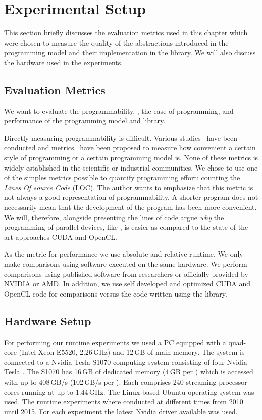 \section{Experimental Setup}
\label{sec:skelcl:experimental_setup}
This section briefly discusses the evaluation metrics used in this chapter which were chosen to measure the quality of the abstractions introduced in the \SkelCL programming model and their implementation in the \SkelCL library.
We will also discuss the hardware used in the experiments.


\subsection{Evaluation Metrics}
We want to evaluate the programmability, \ie, the ease of programming, and performance of the \SkelCL programming model and library.

Directly measuring programmability is difficult.
Various studies~\cite{HochsteinCSAB2005,HochsteinBVG2008} have been conducted and metrics~\cite{VanderwielNL1997} have been proposed to measure how convenient a certain style of programming or a certain programming model is.
None of these metrics is widely established in the scientific or industrial communities.
We chose to use one of the simples metrics possible to quantify programming effort: counting the \emph{Lines Of source Code} (LOC).
The author wants to emphasize that this metric is not always a good representation of programmability.
A shorter program does not necessarily mean that the development of the program has been more convenient.
We will, therefore, alongside presenting the lines of code argue \emph{why} the programming of parallel devices, like \GPUs, is easier as compared to the state-of-the-art approaches CUDA and OpenCL.

As the metric for performance we use absolute and relative runtime.
We only make comparisons using software executed on the same hardware.
We perform comparisons using published software from researchers or officially provided by NVIDIA or AMD.
In addition, we use self developed and optimized CUDA and OpenCL code for comparisons versus the code written using the \SkelCL library.

\subsection{Hardware Setup}
For performing our runtime experiments we used a PC equipped with a quad-core \CPU (Intel Xeon E5520, 2.26\,GHz) and 12\,GB of main memory.
The system is connected to a Nvidia Tesla S1070 computing system consisting of four Nvidia Tesla \GPUs.
The S1070 has 16\,GB of dedicated memory (4\,GB per \GPU) which is accessed with up to 408\,GB/s (102\,GB/s per \GPU).
Each \GPU comprises 240 streaming processor cores running at up to 1.44\,GHz.
The Linux based Ubuntu operating system was used.
The runtime experiments where conducted at different times from 2010 until 2015.
For each experiment the latest Nvidia \GPU driver available was used.

